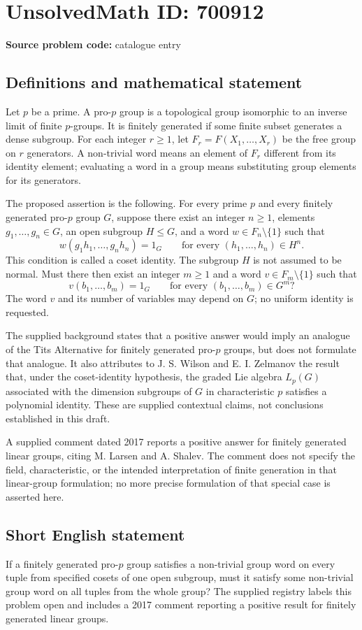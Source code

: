 \documentclass[11pt]{article}
\begin{document}
\section*{UnsolvedMath ID: 700912}
\textbf{Source problem code:} catalogue entry
\subsection{Definitions and mathematical statement}
Let \(p\) be a prime. A pro-\(p\) group is a topological group isomorphic to an inverse limit of finite \(p\)-groups. It is finitely generated if some finite subset generates a dense subgroup. For each integer \(r\geq 1\), let \(F_r=F(X_1,\ldots,X_r)\) be the free group on \(r\) generators. A non-trivial word means an element of \(F_r\) different from its identity element; evaluating a word in a group means substituting group elements for its generators.

The proposed assertion is the following. For every prime \(p\) and every finitely generated pro-\(p\) group \(G\), suppose there exist an integer \(n\geq 1\), elements \(g_1,\ldots,g_n\in G\), an open subgroup \(H\leq G\), and a word \(w\in F_n\setminus\{1\}\) such that
\[
  w(g_1h_1,\ldots,g_nh_n)=1_G
  \qquad\text{for every }(h_1,\ldots,h_n)\in H^n.
\]
This condition is called a coset identity. The subgroup \(H\) is not assumed to be normal. Must there then exist an integer \(m\geq 1\) and a word \(v\in F_m\setminus\{1\}\) such that
\[
  v(b_1,\ldots,b_m)=1_G
  \qquad\text{for every }(b_1,\ldots,b_m)\in G^m?
\]
The word \(v\) and its number of variables may depend on \(G\); no uniform identity is requested.

The supplied background states that a positive answer would imply an analogue of the Tits Alternative for finitely generated pro-\(p\) groups, but does not formulate that analogue. It also attributes to J. S. Wilson and E. I. Zelmanov the result that, under the coset-identity hypothesis, the graded Lie algebra \(L_p(G)\) associated with the dimension subgroups of \(G\) in characteristic \(p\) satisfies a polynomial identity. These are supplied contextual claims, not conclusions established in this draft.

A supplied comment dated 2017 reports a positive answer for finitely generated linear groups, citing M. Larsen and A. Shalev. The comment does not specify the field, characteristic, or the intended interpretation of finite generation in that linear-group formulation; no more precise formulation of that special case is asserted here.
\subsection{Short English statement}
If a finitely generated pro-\(p\) group satisfies a non-trivial group word on every tuple from specified cosets of one open subgroup, must it satisfy some non-trivial group word on all tuples from the whole group? The supplied registry labels this problem open and includes a 2017 comment reporting a positive result for finitely generated linear groups.
\end{document}
